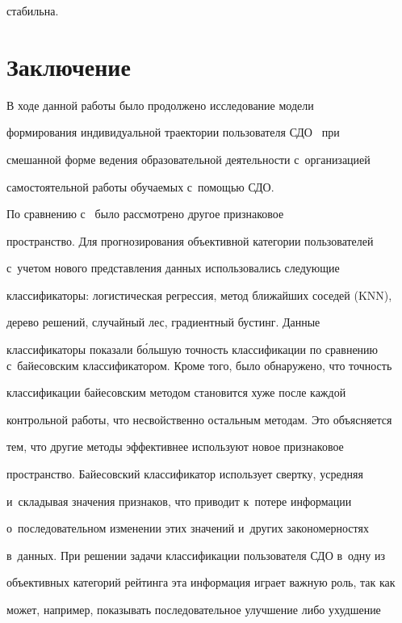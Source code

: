 стабильна.





\section{Заключение}





     В ходе данной работы было продолжено исследование модели 


формирования индивидуальной траектории пользователя СДО~\cite{4-nau} при 


смешанной форме ведения образовательной деятельности с~организацией 


самостоятельной работы обучаемых с~помощью СДО.


     


     По сравнению с~\cite{4-nau} было рассмотрено другое признаковое 


пространство. Для прогнозирования объективной категории пользователей 


с~учетом нового представления данных использовались следующие 


классификаторы: логистическая регрессия, метод ближайших соседей (KNN), 


дерево решений, случайный лес, градиентный бустинг. Данные 


классификаторы показали б\'{о}льшую точность классификации по сравнению с~байесовским классификатором. Кроме того, было обнаружено, что точность 


классификации байесовским методом становится хуже после каждой 


контрольной работы, что несвойственно остальным методам. Это объясняется 


тем, что другие методы эффективнее используют новое признаковое 


пространство. Байесовский классификатор использует свертку, усредняя 


и~складывая значения признаков, что приводит к~потере информации 


о~последовательном изменении этих значений и~других закономерностях 


в~данных. При решении задачи классификации пользователя СДО в~одну из 


объективных категорий рейтинга эта информация играет важную роль, так как 


может, например, показывать последовательное улучшение либо ухудшение 


